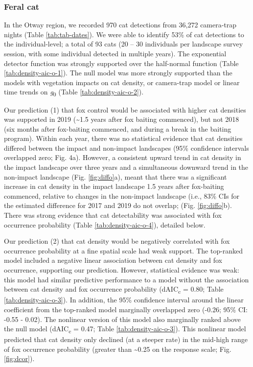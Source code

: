 \documentclass[preprint, 3p, authoryear]{elsarticle} %
\begin{document}
\hypertarget{feral-cat-1}{%
\subsubsection{Feral cat}\label{feral-cat-1}}

In the Otway region, we recorded 970 cat detections from 36,272 camera-trap nights (Table \ref{tab:tab-dates}). We were able to identify 53\% of cat detections to the individual-level; a total of 93 cats (20 -- 30 individuals per landscape survey session, with some individual detected in multiple years). The exponential detector function was strongly supported over the half-normal function (Table \ref{tab:density-aic-o-1}). The null model was more strongly supported than the models with vegetation impacts on cat density, or camera-trap model or linear time trends on \emph{g}\textsubscript{0} (Table \ref{tab:density-aic-o-2}).

Our prediction (1) that fox control would be associated with higher cat densities was supported in 2019 (\textasciitilde1.5 years after fox baiting commenced), but not 2018 (six months after fox-baiting commenced, and during a break in the baiting program). Within each year, there was no statistical evidence that cat densities differed between the impact and non-impact landscapes (95\% confidence intervals overlapped zero; Fig. 4a). However, a consistent upward trend in cat density in the impact landscape over three years and a simultaneous downward trend in the non-impact landscape (Fig. \ref{fig:diffo}a), meant that there was a significant increase in cat density in the impact landscape 1.5 years after fox-baiting commenced, relative to changes in the non-impact landscape (i.e., 83\% CIs for the estimated difference for 2017 and 2019 do not overlap; (Fig. \ref{fig:diffo}b). There was strong evidence that cat detectability was associated with fox occurrence probability (Table \ref{tab:density-aic-o-4}), detailed below.

Our prediction (2) that cat density would be negatively correlated with fox occurrence probability at a fine spatial scale had weak support. The top-ranked model included a negative linear association between cat density and fox occurrence, supporting our prediction. However, statistical evidence was weak: this model had similar predictive performance to a model without the association between cat density and fox occurrence probability (dAIC\textsubscript{c} = 0.80; Table \ref{tab:density-aic-o-3}). In addition, the 95\% confidence interval around the linear coefficient from the top-ranked model marginally overlapped zero (-0.26; 95\% CI: -0.55 - 0.02). The nonlinear version of this model also marginally ranked above the null model (dAIC\textsubscript{c} = 0.47; Table \ref{tab:density-aic-o-3}). This nonlinear model predicted that cat density only declined (at a steeper rate) in the mid-high range of fox occurrence probability (greater than \textasciitilde0.25 on the response scale; Fig. \ref{fig:dcor}).
\end{document}
